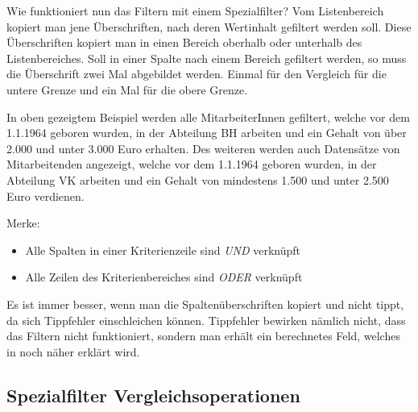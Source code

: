 Wie funktioniert nun das Filtern mit einem Spezialfilter? Vom Listenbereich kopiert man jene Überschriften, nach deren Wertinhalt gefiltert werden soll. Diese Überschriften kopiert man in einen Bereich oberhalb oder unterhalb des Listenbereiches. Soll in einer Spalte nach einem Bereich gefiltert werden, so muss die Überschrift zwei Mal abgebildet werden. Einmal für den Vergleich für die untere Grenze und ein Mal für die obere Grenze.
	
In oben gezeigtem Beispiel werden alle MitarbeiterInnen gefiltert, welche vor dem 1.1.1964 geboren wurden, in der Abteilung BH arbeiten und ein Gehalt von über 2.000 und unter 3.000 Euro erhalten. Des weiteren werden auch Datensätze von Mitarbeitenden angezeigt, welche vor dem 1.1.1964 geboren wurden, in der Abteilung VK arbeiten und ein Gehalt von mindestens 1.500 und unter 2.500 Euro verdienen.

\begin{lightbulbbox}
Merke:
\begin{itemize}
	\smallitemize
	\item Alle Spalten in einer Kriterienzeile sind \textit{UND} verknüpft
	\item Alle Zeilen des Kriterienbereiches sind \textit{ODER} verknüpft
\end{itemize}
\end{lightbulbbox}
%
\begin{lightbulbbox}
Es ist immer besser, wenn man die Spaltenüberschriften kopiert und nicht tippt, da sich Tippfehler einschleichen können. Tippfehler bewirken nämlich nicht, dass das Filtern nicht funktioniert, sondern man erhält ein berechnetes Feld, welches in  noch näher erklärt wird.
\end{lightbulbbox}
	
\subsection{Spezialfilter Vergleichsoperationen}
	
